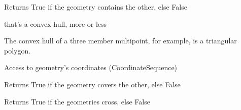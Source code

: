 \documentclass[letterpaper,10pt,english]{sphinxmanual}
\begin{document}
\begin{fulllineitems}
\begin{fulllineitems}
\end{fulllineitems}


\begin{fulllineitems}
\label{\detokenize{reference:taipanPyRouter.ESegment.contains}}
Returns True if the geometry contains the other, else False

\end{fulllineitems}


\begin{fulllineitems}
\label{\detokenize{reference:taipanPyRouter.ESegment.convex_hull}}
 \textendash{} that’s a
convex hull, more or less

The convex hull of a three member multipoint, for example, is a
triangular polygon.

\end{fulllineitems}


\begin{fulllineitems}
\label{\detokenize{reference:taipanPyRouter.ESegment.coords}}
Access to geometry’s coordinates (CoordinateSequence)

\end{fulllineitems}


\begin{fulllineitems}
\label{\detokenize{reference:taipanPyRouter.ESegment.covers}}
Returns True if the geometry covers the other, else False

\end{fulllineitems}


\begin{fulllineitems}
\label{\detokenize{reference:taipanPyRouter.ESegment.crosses}}
Returns True if the geometries cross, else False


\end{fulllineitems}
\end{fulllineitems}
\end{document}
